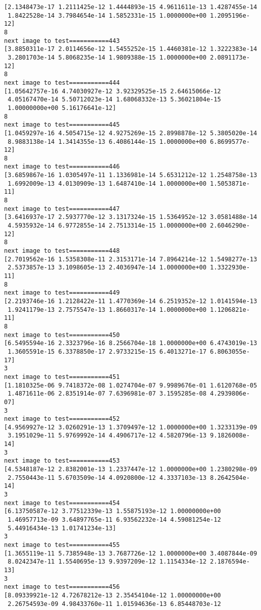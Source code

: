 \documentclass[11pt]{article}
\begin{document}
\begin{Verbatim}[commandchars=\\\{\}]
[2.1348473e-17 1.2111425e-12 1.4444893e-15 4.9611611e-13 1.4287455e-14
 1.8422528e-14 3.7984654e-14 1.5852331e-15 1.0000000e+00 1.2095196e-12]
8
next image to test===========443
[3.8850311e-17 2.0114656e-12 1.5455252e-15 1.4460381e-12 1.3222383e-14
 3.2801703e-14 5.8068235e-14 1.9809388e-15 1.0000000e+00 2.0891173e-12]
8
next image to test===========444
[1.05642757e-16 4.74030927e-12 3.92329525e-15 2.64615066e-12
 4.05167470e-14 5.50712023e-14 1.68068332e-13 5.36021804e-15
 1.00000000e+00 5.16176641e-12]
8
next image to test===========445
[1.0459297e-16 4.5054715e-12 4.9275269e-15 2.8998878e-12 5.3805020e-14
 8.9883138e-14 1.3414355e-13 6.4086144e-15 1.0000000e+00 6.8699577e-12]
8
next image to test===========446
[3.6859867e-16 1.0305497e-11 1.1336981e-14 5.6531212e-12 1.2548758e-13
 1.6992009e-13 4.0130909e-13 1.6487410e-14 1.0000000e+00 1.5053871e-11]
8
next image to test===========447
[3.6416937e-17 2.5937770e-12 3.1317324e-15 1.5364952e-12 3.0581488e-14
 4.5935932e-14 6.9772855e-14 2.7513314e-15 1.0000000e+00 2.6046290e-12]
8
next image to test===========448
[2.7019562e-16 1.5358308e-11 2.3153171e-14 7.8964214e-12 1.5498277e-13
 2.5373857e-13 3.1098605e-13 2.4036947e-14 1.0000000e+00 1.3322930e-11]
8
next image to test===========449
[2.2193746e-16 1.2128422e-11 1.4770369e-14 6.2519352e-12 1.0141594e-13
 1.9241179e-13 2.7575547e-13 1.8660317e-14 1.0000000e+00 1.1206821e-11]
8
next image to test===========450
[6.5495594e-16 2.3323796e-16 8.2566704e-18 1.0000000e+00 6.4743019e-13
 1.3605591e-15 6.3378850e-17 2.9733215e-15 6.4013271e-17 6.8063055e-17]
3
next image to test===========451
[1.1810325e-06 9.7418372e-08 1.0274704e-07 9.9989676e-01 1.6120768e-05
 1.4871611e-06 2.8351914e-07 7.6396981e-07 3.1595285e-08 4.2939806e-07]
3
next image to test===========452
[4.9569927e-12 3.0260291e-13 1.3709497e-12 1.0000000e+00 1.3233139e-09
 3.1951029e-11 5.9769992e-14 4.4906717e-12 4.5820796e-13 9.1826008e-14]
3
next image to test===========453
[4.5348187e-12 2.8382001e-13 1.2337447e-12 1.0000000e+00 1.2380298e-09
 2.7550443e-11 5.6703509e-14 4.0920800e-12 4.3337103e-13 8.2642504e-14]
3
next image to test===========454
[6.13750587e-12 3.77512339e-13 1.55875193e-12 1.00000000e+00
 1.46957713e-09 3.64897765e-11 6.93562232e-14 4.59081254e-12
 5.44916434e-13 1.01741234e-13]
3
next image to test===========455
[1.3655119e-11 5.7385948e-13 3.7687726e-12 1.0000000e+00 3.4087844e-09
 8.0242347e-11 1.5540695e-13 9.9397209e-12 1.1154334e-12 2.1876594e-13]
3
next image to test===========456
[8.09339921e-12 4.72678212e-13 2.35454104e-12 1.00000000e+00
 2.26754593e-09 4.98433760e-11 1.01594636e-13 6.85448703e-12

\end{Verbatim}
\end{document}
